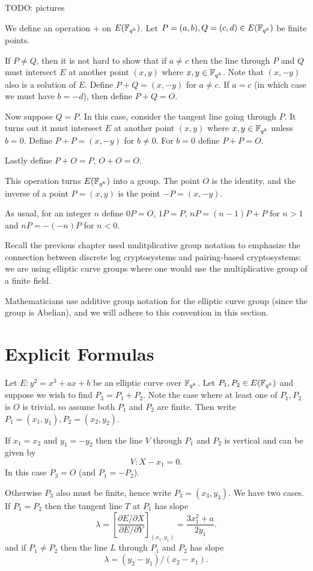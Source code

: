 TODO: pictures

We define an operation $+$ on $E(\mathbb{F}_{q^k})$.
Let $P = (a,b), Q = (c,d) \in E(\mathbb{F}_{q^k})$ be finite points.

If $P \ne Q$, then it is not hard to show that if $a \ne c$
then the line through $P$ and $Q$ must intersect $E$ at another point
$(x,y)$ where $x, y\in \mathbb{F}_{q^k}$. Note that $(x,-y)$ also is a solution of $E$.
Define $P + Q = (x, -y)$ for $a \ne c$.
If $a = c$ (in which case we must have $b = -d$),
then define $P + Q = O$.

Now suppose $Q = P$. In this case, consider the tangent line going through
$P$. It turns out it must intersect $E$ at another point $(x,y)$ where
$x,y\in\mathbb{F}_{q^k}$ unless $b = 0$. Define $P + P = (x, -y)$ for $b \ne 0$.
For $b = 0$ define $P + P = O$.

Lastly define $P + O = P$, $O + O = O$.

This operation turns $E(\mathbb{F}_{q^k})$ into a group.
The point $O$ is the identity, and the inverse
of a point $P = (x,y)$ is the point $-P = (x,-y)$.

As usual, for an integer $n$ define $0 P = O$, $1 P = P$,
$n P = (n-1)P + P$ for $n > 1$ and $n P = -(-n)P$ for $n < 0$.

Recall the previous chapter used mulitplicative group notation to emphasize
the connection
between discrete log cryptosystems and pairing-based cryptosystems:
we are using elliptic curve groups where one would use
the multiplicative group of a finite field.

Mathematicians use additive group notation for the elliptic curve group
(since the group is Abelian), and we will adhere to this convention in this
section.

\section {Explicit Formulas}

Let $E: y^2 = x^3 + ax + b$ be an elliptic curve over $\mathbb{F}_{q^k}$. Let
$P_1, P_2 \in E(\mathbb{F}_{q^k})$ and suppose
we wish to find $P_3 = P_1 + P_2$.
Note the case where at least one of $P_1, P_2$ is $O$ is trivial,
so assume both $P_1$ and $P_2$ are finite.
Then write $P_1 = (x_1, y_1), P_2 = (x_2, y_2)$.

If $x_1 = x_2$ and $y_1 = -y_2$
then the line $V$ through $P_1$ and $P_2$ is vertical and
can be given by
\[ V : X - x_1 = 0  . \]
In this case $P_3 = O$ (and $P_1 = -P_2$).

Otherwise $P_3$ also must be finite, hence write $P_3 = (x_3, y_3)$.
We have two cases. If $P_1 = P_2$ then the tangent line $T$ at
$P_1$
has slope
\[\lambda =
\left[ \frac{\partial E / \partial X}{\partial E/ \partial Y} \right]_{(x_1,y_1)}
= \frac{3x_1^2 + a}{2y_1} . \]
and if $P_1 \ne P_2$ then the line $L$ through $P_1$ and $P_2$ has slope
\[ \lambda = (y_2 - y_1)/(x_2 - x_1) . \]

